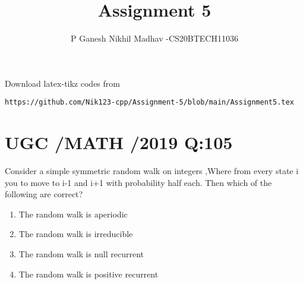 \documentclass[journal,12pt,twocolumn]{IEEEtran}
\begin{document}
     \def\rightbox#1{\makebox[0in][r]{#1}}
     \def\centbox#1{\makebox[0in]{#1}}
     \def\topbox#1{\raisebox{-\baselineskip}[0in][0in]{#1}}
     \def\midbox#1{\raisebox{-0.5\baselineskip}[0in][0in]{#1}}
\vspace{3cm}
\title{Assignment 5}
\author{P Ganesh Nikhil Madhav -CS20BTECH11036}
\maketitle
\newpage
\bigskip
\renewcommand{\thefigure}{\theenumi}
\renewcommand{\thetable}{\theenumi}
Download latex-tikz codes from 
\begin{lstlisting}
https://github.com/Nik123-cpp/Assignment-5/blob/main/Assignment5.tex
\end{lstlisting}
\section{ UGC /MATH /2019 Q:105 }
Consider a simple symmetric random walk on integers ,Where from every state i you to move to i-1 and i+1 with  probability half each. Then which of the following are correct?
\begin{enumerate}
    \item The random walk is aperiodic
    \item The random walk is irreducible
    \item The random walk is null recurrent 
    \item The random walk is positive recurrent 
\end{enumerate}
\end{document}
